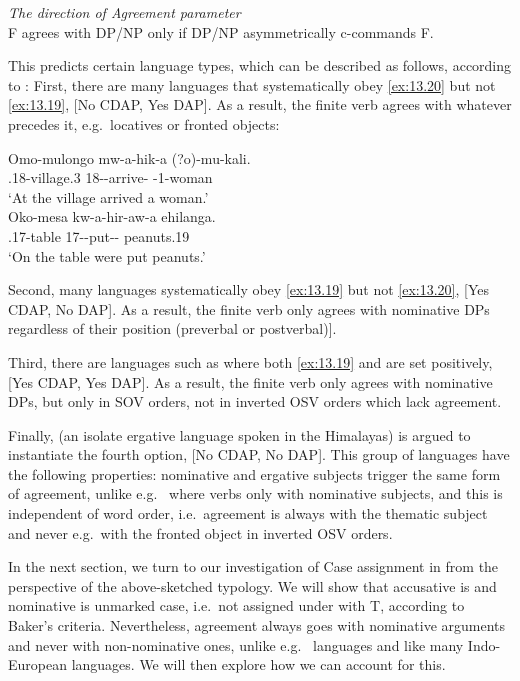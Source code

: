 \documentclass[output=paper]{langsci/langscibook}
\begin{document}
\ea\label{ex:13.20}
    \emph{The direction of Agreement parameter}\\
    F agrees with DP/NP only if DP/NP asymmetrically c-commands F.
\z

This predicts certain language types, which can be described as follows,
according to \citet{Baker2008}: First, there are many  languages
that systematically obey \eqref{ex:13.20} but not \eqref{ex:13.19}, [No
\gls{CDAP}, Yes \gls{DAP}]. As a result, the finite verb agrees with whatever
precedes it, e.g.\ locatives or fronted objects:

\ea%
    \label{ex:13.21} \citep[158]{Baker2008}
	\ea
	\gll  Omo-mulongo mw-a-hik-a (?o)-mu-kali.\\
    \Loc.18-village.3 18\Sm-\Tns-arrive-\Fv{} \Aug{}-1-woman\\
	\glt     ‘At the village arrived a woman.’\\
    \ex
    \gll Oko-mesa kw-a-hir-aw-a ehilanga.\\
    \Loc.17-table 17\Sm-\Tns-put-\Pass{}-\Fv{} peanuts.19\\
    \glt ‘On the table were put peanuts.’
    \z
\z

Second, many  languages systematically obey \eqref{ex:13.19} but
not \eqref{ex:13.20}, [Yes \gls{CDAP}, No \gls{DAP}]. As a result, the finite verb only
agrees with nominative DPs regardless of their position (preverbal or
postverbal)].

Third, there are languages such as  where both \eqref{ex:13.19}
and  are set positively, [Yes \gls{CDAP}, Yes \gls{DAP}]. As a
result, the finite verb only agrees with nominative DPs,
but only in SOV orders, not in inverted OSV orders which lack agreement.

Finally,  (an isolate ergative language spoken in the Himalayas) is
argued to instantiate the fourth option, [No \gls{CDAP}, No \gls{DAP}]. This group of
languages have the following properties: nominative and ergative subjects
trigger the same form of agreement, unlike e.g.\  where verbs  only
with nominative subjects, and this is independent of word order, i.e.\ agreement
is always with the thematic subject and never e.g.\ with the fronted object in
inverted OSV orders.

In the next section, we turn to our investigation of Case assignment in
 from the perspective of the above-sketched typology. We will show
that accusative is  and
nominative is unmarked case, i.e.\ not assigned under
 with T, according to Baker’s criteria. Nevertheless, agreement
always goes with nominative arguments and never with
non-nominative ones, unlike e.g.\  languages and like many Indo-European
languages. We will then explore how we can account for this.
\end{document}
